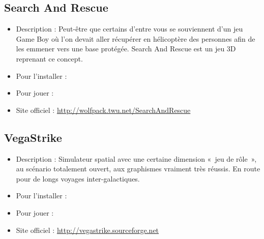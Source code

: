 \subsection{Search And Rescue}
\begin{itemize}
\begingroup
{}
\item Description : Peut-être que certains d'entre vous se souviennent d'un jeu Game Boy où l'on devait aller récupérer en hélicoptère des personnes afin de les emmener vers une base protégée. Search And Rescue est un jeu 3D reprenant ce concept.{\par}
\item Pour l'installer : 
\item Pour jouer : 
\item Site officiel : \url{http://wolfpack.twu.net/SearchAndRescue}{\par}
\endgroup
\end{itemize}
\subsection{VegaStrike}
\begin{itemize}
\begingroup
{}
\item Description : Simulateur spatial avec une certaine dimension «~jeu de rôle~», au scénario totalement ouvert, aux graphismes vraiment très réussis. En route pour de longs voyages inter-galactiques.{\par}
\endgroup
\item Pour l'installer : 
\item Pour jouer : 
\item Site officiel : \url{http://vegastrike.sourceforge.net}{\par}
\end{itemize}
